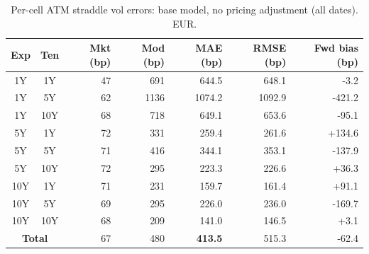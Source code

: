 \begin{table}[H]
\centering
\label{tab:base_per_cell_all}
\small
\begin{tabular}{@{}ccrrrrr@{}}
\toprule
\textbf{Exp} & \textbf{Ten} & \textbf{Mkt (bp)} & \textbf{Mod (bp)} & \textbf{MAE (bp)} & \textbf{RMSE (bp)} & \textbf{Fwd bias (bp)} \\
\midrule
  1Y & 1Y & 47 & 691 & 644.5 & 648.1 & -3.2 \\
  1Y & 5Y & 62 & 1136 & 1074.2 & 1092.9 & -421.2 \\
  1Y & 10Y & 68 & 718 & 649.1 & 653.6 & -95.1 \\
  \midrule
  5Y & 1Y & 72 & 331 & 259.4 & 261.6 & +134.6 \\
  5Y & 5Y & 71 & 416 & 344.1 & 353.1 & -137.9 \\
  5Y & 10Y & 72 & 295 & 223.3 & 226.6 & +36.3 \\
  \midrule
  10Y & 1Y & 71 & 231 & 159.7 & 161.4 & +91.1 \\
  10Y & 5Y & 69 & 295 & 226.0 & 236.0 & -169.7 \\
  10Y & 10Y & 68 & 209 & 141.0 & 146.5 & +3.1 \\
\midrule
  \multicolumn{2}{c}{\textbf{Total}} & 67 & 480 & \textbf{413.5} & 515.3 & -62.4 \\
\bottomrule
\end{tabular}
\caption{Per-cell ATM straddle vol errors: base model, no pricing adjustment (all dates). EUR.}
\end{table}